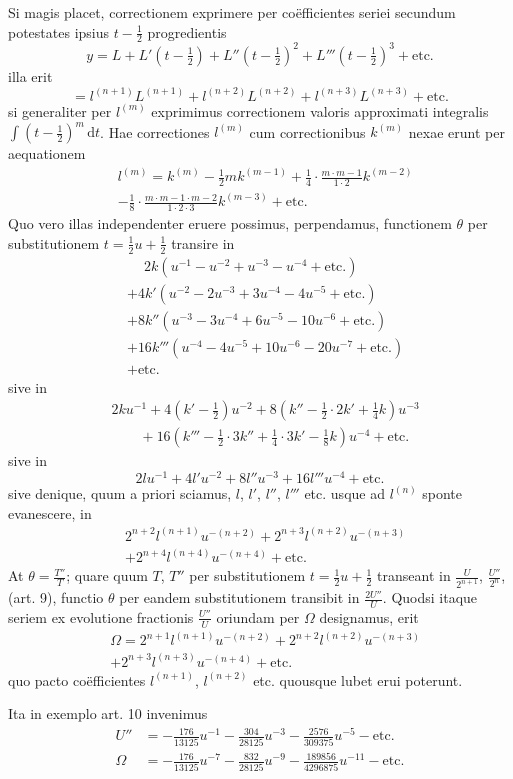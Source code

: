 Si magis placet, correctionem exprimere per co\"efficientes seriei secundum potestates ipsius $t-\tfrac12$ progredientis
\[
y=L+L'(t-\tfrac12)+L''(t-\tfrac12)^2+L'''(t-\tfrac12)^3+\text{etc.}
\]
illa erit
\[
=l^{(n+1)}L^{(n+1)}+l^{(n+2)}L^{(n+2)}+l^{(n+3)}L^{(n+3)}+\text{etc.}
\]
si generaliter per $l^{(m)}$ exprimimus correctionem valoris approximati integralis $\int(t-\tfrac12)^m\,\mathrm{d}t$. Hae correctiones $l^{(m)}$ cum correctionibus $k^{(m)}$ nexae erunt per aequationem
\[
\begin{aligned}&l^{(m)}=k^{(m)}-\tfrac12mk^{(m-1)}+\tfrac14\cdot\frac{m\cdot m-1}{1\cdot2}k^{(m-2)}\\ &-\tfrac18\cdot\frac{m\cdot m-1\cdot m-2}{1\cdot2\cdot3}k^{(m-3)}+\text{etc.}\end{aligned}
\]
Quo vero illas independenter eruere possimus, perpendamus, functionem $\theta$ per substitutionem $t=\tfrac12u+\tfrac12$ transire in
\[
\begin{aligned}
&\phantom{{}+{}}2k(u^{-1}-u^{-2}+u^{-3}-u^{-4}+\text{etc.})\\
&+4k'(u^{-2}-2u^{-3}+3u^{-4}-4u^{-5}+\text{etc.})\\
&+8k''(u^{-3}-3u^{-4}+6u^{-5}-10u^{-6}+\text{etc.})\\
&+16k'''(u^{-4}-4u^{-5}+10u^{-6}-20u^{-7}+\text{etc.})\\
&+\text{etc.}
\end{aligned}
\]
sive in
\[
\begin{aligned}
&2ku^{-1}+4(k'-\tfrac12)u^{-2}+8(k''-\tfrac12\cdot2k'+\tfrac14k)u^{-3}\\
&\qquad+16(k'''-\tfrac12\cdot3k''+\tfrac14\cdot3k'-\tfrac18k)u^{-4}+\text{etc.}
\end{aligned}
\]
sive in
\[
2lu^{-1}+4l'u^{-2}+8l''u^{-3}+16l'''u^{-4}+\text{etc.}
\]
sive denique, quum a priori sciamus, $l$, $l'$, $l''$, $l'''$ etc. usque ad $l^{(n)}$ sponte evanescere, in
\[
\begin{aligned}&2^{n+2}l^{(n+1)}u^{-(n+2)}+2^{n+3}l^{(n+2)}u^{-(n+3)}\\ &+2^{n+4}l^{(n+4)}u^{-(n+4)}+\text{etc.}\end{aligned}
\]
At $\theta=\frac{T''}{T}$; quare quum $T$, $T''$ per substitutionem $t=\tfrac12u+\tfrac12$ transeant in $\frac{U}{2^{n+1}}$, $\frac{U''}{2^n}$, (art. 9), functio $\theta$ per eandem substitutionem transibit in $\frac{2U''}{U}$. Quodsi itaque seriem ex evolutione fractionis $\frac{U''}{U}$ oriundam per $\Omega$ designamus, erit
\[
\begin{aligned}&\Omega=2^{n+1}l^{(n+1)}u^{-(n+2)}+2^{n+2}l^{(n+2)}u^{-(n+3)}\\ &+2^{n+3}l^{(n+3)}u^{-(n+4)}+\text{etc.}\end{aligned}
\]
quo pacto co\"efficientes $l^{(n+1)}$, $l^{(n+2)}$ etc. quousque lubet erui poterunt.

Ita in exemplo art. 10 invenimus
\[
\begin{aligned}
U''&=-\tfrac{176}{13125}u^{-1}-\tfrac{304}{28125}u^{-3}-\tfrac{2576}{309375}u^{-5}-\text{etc.}\\
\Omega&=-\tfrac{176}{13125}u^{-7}-\tfrac{832}{28125}u^{-9}-\tfrac{189856}{4296875}u^{-11}-\text{etc.}
\end{aligned}
\]
